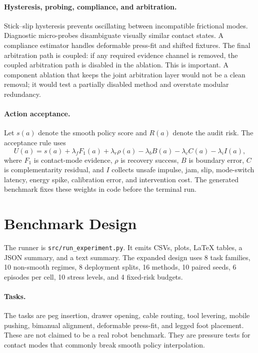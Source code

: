 \documentclass{article}
\begin{document}
\paragraph{Hysteresis, probing, compliance, and arbitration.}
Stick--slip hysteresis prevents oscillating between incompatible frictional modes. Diagnostic micro-probes disambiguate visually similar contact states. A compliance estimator handles deformable press-fit and shifted fixtures. The final arbitration path is coupled: if any required evidence channel is removed, the coupled arbitration path is disabled in the ablation. This is important. A component ablation that keeps the joint arbitration layer would not be a clean removal; it would test a partially disabled method and overstate modular redundancy.

\paragraph{Action acceptance.}
Let $s(a)$ denote the smooth policy score and $R(a)$ denote the audit risk. The acceptance rule uses
\[
  U(a)=s(a) + \lambda_f F_1(a) + \lambda_r \rho(a) - \lambda_b B(a)
       - \lambda_c C(a) - \lambda_i I(a),
\]
where $F_1$ is contact-mode evidence, $\rho$ is recovery success, $B$ is boundary error, $C$ is complementarity residual, and $I$ collects unsafe impulse, jam, slip, mode-switch latency, energy spike, calibration error, and intervention cost. The generated benchmark fixes these weights in code before the terminal run.

\section{Benchmark Design}
The runner is \texttt{src/run\_experiment.py}. It emits CSVs, plots, LaTeX tables, a JSON summary, and a text summary. The expanded design uses 8 task families, 10 non-smooth regimes, 8 deployment splits, 16 methods, 10 paired seeds, 6 episodes per cell, 10 stress levels, and 4 fixed-risk budgets.

\paragraph{Tasks.}
The tasks are peg insertion, drawer opening, cable routing, tool levering, mobile pushing, bimanual alignment, deformable press-fit, and legged foot placement. These are not claimed to be a real robot benchmark. They are pressure tests for contact modes that commonly break smooth policy interpolation.
\end{document}
